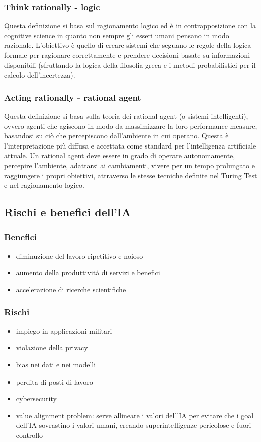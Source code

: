 \subsubsection*{Think rationally - logic}
Questa definizione si basa sul ragionamento logico ed è in contrapposizione con la cognitive science in quanto non sempre gli
esseri umani pensano in modo razionale. L'obiettivo è quello di creare sistemi che seguano le regole della logica formale per
ragionare correttamente e prendere decisioni basate su informazioni disponibili (sfruttando la logica della filosofia greca
e i metodi probabilistici per il calcolo dell'incertezza).

\subsubsection*{Acting rationally - rational agent}
Questa definizione si basa sulla teoria dei rational agent (o sistemi intelligenti), ovvero agenti che agiscono in modo
da massimizzare la loro performance measure, basandosi su ciò che percepiscono dall'ambiente in cui operano. Questa è
l'interpretazione più diffusa e accettata come standard per l'intelligenza artificiale attuale. Un rational agent deve
essere in grado di operare autonomamente, percepire l'ambiente, adattarsi ai cambiamenti, vivere per un tempo prolungato
e raggiungere i propri obiettivi, attraverso le stesse tecniche definite nel Turing Test e nel ragionamento logico.

\subsection{Rischi e benefici dell'IA}
\subsubsection*{Benefici}
\begin{itemize}
	\item diminuzione del lavoro ripetitivo e noioso
	\item aumento della produttività di servizi e benefici
	\item accelerazione di ricerche scientifiche
\end{itemize}

\subsubsection*{Rischi}
\begin{itemize}
	\item impiego in applicazioni militari
	\item violazione della privacy
	\item bias nei dati e nei modelli
	\item perdita di posti di lavoro
	\item cybersecurity
	\item value alignment problem: serve allineare i valori dell'IA per evitare che i goal dell'IA sovrastino i valori umani,
	creando superintelligenze pericolose e fuori controllo
\end{itemize}
